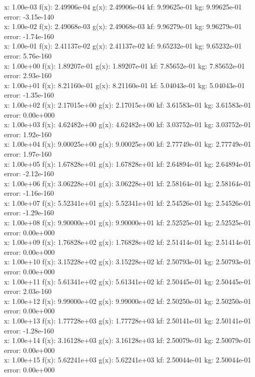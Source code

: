 \documentclass[12pt]{article}
\begin{document}
x: 1.00e-03 f(x): 2.49906e-04 g(x): 2.49906e-04 kf: 9.99625e-01 kg:  9.99625e-01 error: -3.15e-140 \\
x: 1.00e-02 f(x): 2.49068e-03 g(x): 2.49068e-03 kf: 9.96279e-01 kg:  9.96279e-01 error: -1.74e-160 \\
x: 1.00e-01 f(x): 2.41137e-02 g(x): 2.41137e-02 kf: 9.65232e-01 kg:  9.65232e-01 error:  5.76e-160 \\
x: 1.00e+00 f(x): 1.89207e-01 g(x): 1.89207e-01 kf: 7.85652e-01 kg:  7.85652e-01 error:  2.93e-160 \\
x: 1.00e+01 f(x): 8.21160e-01 g(x): 8.21160e-01 kf: 5.04043e-01 kg:  5.04043e-01 error: -1.35e-160 \\
x: 1.00e+02 f(x): 2.17015e+00 g(x): 2.17015e+00 kf: 3.61583e-01 kg:  3.61583e-01 error:  0.00e+000 \\
x: 1.00e+03 f(x): 4.62482e+00 g(x): 4.62482e+00 kf: 3.03752e-01 kg:  3.03752e-01 error:  1.92e-160 \\
x: 1.00e+04 f(x): 9.00025e+00 g(x): 9.00025e+00 kf: 2.77749e-01 kg:  2.77749e-01 error:  1.97e-160 \\
x: 1.00e+05 f(x): 1.67828e+01 g(x): 1.67828e+01 kf: 2.64894e-01 kg:  2.64894e-01 error: -2.12e-160 \\
x: 1.00e+06 f(x): 3.06228e+01 g(x): 3.06228e+01 kf: 2.58164e-01 kg:  2.58164e-01 error: -1.16e-160 \\
x: 1.00e+07 f(x): 5.52341e+01 g(x): 5.52341e+01 kf: 2.54526e-01 kg:  2.54526e-01 error: -1.29e-160 \\
x: 1.00e+08 f(x): 9.90000e+01 g(x): 9.90000e+01 kf: 2.52525e-01 kg:  2.52525e-01 error:  0.00e+000 \\
x: 1.00e+09 f(x): 1.76828e+02 g(x): 1.76828e+02 kf: 2.51414e-01 kg:  2.51414e-01 error:  0.00e+000 \\
x: 1.00e+10 f(x): 3.15228e+02 g(x): 3.15228e+02 kf: 2.50793e-01 kg:  2.50793e-01 error:  0.00e+000 \\
x: 1.00e+11 f(x): 5.61341e+02 g(x): 5.61341e+02 kf: 2.50445e-01 kg:  2.50445e-01 error:  2.03e-160 \\
x: 1.00e+12 f(x): 9.99000e+02 g(x): 9.99000e+02 kf: 2.50250e-01 kg:  2.50250e-01 error:  0.00e+000 \\
x: 1.00e+13 f(x): 1.77728e+03 g(x): 1.77728e+03 kf: 2.50141e-01 kg:  2.50141e-01 error: -1.28e-160 \\
x: 1.00e+14 f(x): 3.16128e+03 g(x): 3.16128e+03 kf: 2.50079e-01 kg:  2.50079e-01 error:  0.00e+000 \\
x: 1.00e+15 f(x): 5.62241e+03 g(x): 5.62241e+03 kf: 2.50044e-01 kg:  2.50044e-01 error:  0.00e+000 \\
\end{document}
